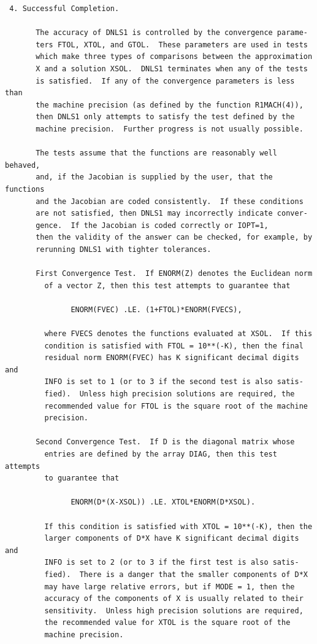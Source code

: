 \documentclass[11pt,twoside]{article}
\begin{document}
\begin{verbatim}
 4. Successful Completion.

       The accuracy of DNLS1 is controlled by the convergence parame-
       ters FTOL, XTOL, and GTOL.  These parameters are used in tests
       which make three types of comparisons between the approximation
       X and a solution XSOL.  DNLS1 terminates when any of the tests
       is satisfied.  If any of the convergence parameters is less than
       the machine precision (as defined by the function R1MACH(4)),
       then DNLS1 only attempts to satisfy the test defined by the
       machine precision.  Further progress is not usually possible.

       The tests assume that the functions are reasonably well behaved,
       and, if the Jacobian is supplied by the user, that the functions
       and the Jacobian are coded consistently.  If these conditions
       are not satisfied, then DNLS1 may incorrectly indicate conver-
       gence.  If the Jacobian is coded correctly or IOPT=1,
       then the validity of the answer can be checked, for example, by
       rerunning DNLS1 with tighter tolerances.

       First Convergence Test.  If ENORM(Z) denotes the Euclidean norm
         of a vector Z, then this test attempts to guarantee that

               ENORM(FVEC) .LE. (1+FTOL)*ENORM(FVECS),

         where FVECS denotes the functions evaluated at XSOL.  If this
         condition is satisfied with FTOL = 10**(-K), then the final
         residual norm ENORM(FVEC) has K significant decimal digits and
         INFO is set to 1 (or to 3 if the second test is also satis-
         fied).  Unless high precision solutions are required, the
         recommended value for FTOL is the square root of the machine
         precision.

       Second Convergence Test.  If D is the diagonal matrix whose
         entries are defined by the array DIAG, then this test attempts
         to guarantee that

               ENORM(D*(X-XSOL)) .LE. XTOL*ENORM(D*XSOL).

         If this condition is satisfied with XTOL = 10**(-K), then the
         larger components of D*X have K significant decimal digits and
         INFO is set to 2 (or to 3 if the first test is also satis-
         fied).  There is a danger that the smaller components of D*X
         may have large relative errors, but if MODE = 1, then the
         accuracy of the components of X is usually related to their
         sensitivity.  Unless high precision solutions are required,
         the recommended value for XTOL is the square root of the
         machine precision.


\end{verbatim}
\end{document}
